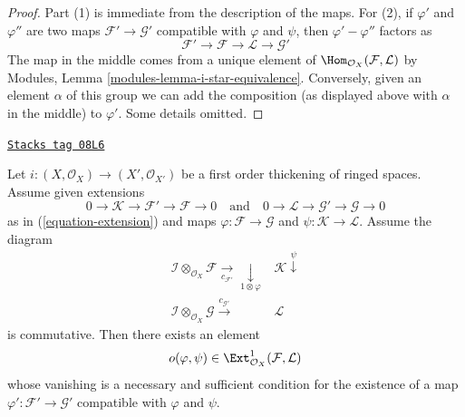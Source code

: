 \begin{proof}
Part (1) is immediate from the description of the maps.
For (2), if $\varphi'$ and $\varphi''$ are two maps
$\mathcal{F}' \to \mathcal{G}'$ compatible with $\varphi$
and $\psi$, then $\varphi' - \varphi''$ factors as
$$
\mathcal{F}' \to \mathcal{F} \to \mathcal{L} \to \mathcal{G}'
$$
The map in the middle comes from a unique element of
$\Hom_{\mathcal{O}_X}(\mathcal{F}, \mathcal{L})$ by
Modules, Lemma \ref{modules-lemma-i-star-equivalence}.
Conversely, given an element $\alpha$ of this group we can add the
composition (as displayed above with $\alpha$ in the middle)
to $\varphi'$. Some details omitted.
\end{proof}

\begin{lemma}
\label{defos-lemma-inf-obs-map}
\href{https://stacks.math.columbia.edu/tag/08L6}{\texttt{Stacks tag 08L6}}

Let $i : (X, \mathcal{O}_X) \to (X', \mathcal{O}_{X'})$
be a first order thickening of ringed spaces. Assume given
extensions
$$
0 \to \mathcal{K} \to \mathcal{F}' \to \mathcal{F} \to 0
\quad\text{and}\quad
0 \to \mathcal{L} \to \mathcal{G}' \to \mathcal{G} \to 0
$$
as in (\ref{equation-extension})
and maps $\varphi : \mathcal{F} \to \mathcal{G}$ and
$\psi : \mathcal{K} \to \mathcal{L}$. Assume the diagram
$$
\begin{array}{cc}\mathcal{I} \otimes_{\mathcal{O}_X} \mathcal{F}
\underset{c_{\mathcal{F}'}}{\longrightarrow}\underset{1 \otimes \varphi}{\downarrow} & \mathcal{K} \overset{\psi}{\downarrow} \\ \mathcal{I} \otimes_{\mathcal{O}_X} \mathcal{G}
\overset{c_{\mathcal{G}'}}{\longrightarrow} & \mathcal{L}\end{array}
$$
is commutative. Then there exists an element
$$
o(\varphi, \psi) \in
\Ext^1_{\mathcal{O}_X}(\mathcal{F}, \mathcal{L})
$$
whose vanishing is a necessary and sufficient condition for the existence
of a map $\varphi' : \mathcal{F}' \to \mathcal{G}'$ compatible with
$\varphi$ and $\psi$.
\end{lemma}

